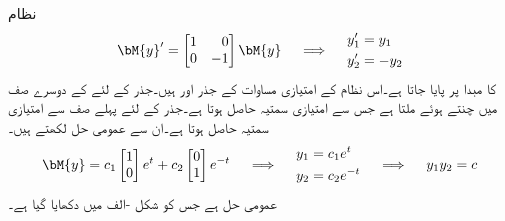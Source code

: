 نظام
\begin{gather}\label{مساوات_نظام_نقطہ_زین}
\begin{aligned}
\bM{y}'=\begin{bmatrix*}[r] 1&0 \\ 0&-1 \end{bmatrix*} \bM{y}
\end{aligned}\quad \implies \quad
\begin{aligned}
y_1'&=y_1\\ 
y_2'&=-y_2
\end{aligned}
\end{gather}
کا  مبدا پر پایا جاتا ہے۔اس نظام کے امتیازی مساوات  کے جذر  اور  ہیں۔جذر  کے لئے  کے دوسرے صف  میں  چنتے ہوئے  ملتا ہے جس سے  امتیازی سمتیہ  حاصل ہوتا ہے۔جذر  کے لئے پہلے صف سے امتیازی سمتیہ  حاصل ہوتا ہے۔ان سے عمومی حل لکھتے ہیں۔
\begin{gather}
\begin{aligned}
\bM{y}=c_1\begin{bmatrix}1 \\ 0  \end{bmatrix} e^t+c_2\begin{bmatrix}  0\\1 \end{bmatrix} e^{-t}
\end{aligned} \quad \implies\quad
\begin{aligned}
y_1&=c_1e^t\\
y_2&=c_2e^{-t}
\end{aligned}\quad \implies \quad
\begin{aligned}
y_1y_2=c
\end{aligned}
\end{gather}
عمومی حل  ہے جس کو شکل -الف میں دکھایا گیا ہے۔
